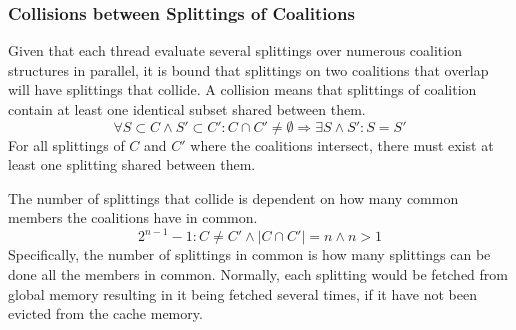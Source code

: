 \documentclass{llncs}
\begin{document}
\subsubsection{Collisions between Splittings of Coalitions} \label{sectionsplit}
Given that each thread evaluate several splittings over numerous coalition structures in parallel, 
it is bound that splittings on two coalitions that overlap will have splittings that collide.
A collision means that splittings of coalition contain at least one identical subset shared between them.
\begin{displaymath}\forall S\subset C \wedge S' \subset C' : C \cap C' \neq \emptyset \Rightarrow \exists S \wedge S' : S = S'\end{displaymath}
For all splittings of $C$ and $C'$ where the coalitions intersect, there must exist at least one splitting shared between them.

The number of splittings that collide is dependent on how many common members the coalitions have in common.
\begin{displaymath}2^{n-1}-1:C\neq C'\wedge |C \cap C'| = n \wedge n > 1 \end{displaymath}
Specifically, the number of splittings in common is how many splittings
can be done all the members in common. Normally, each splitting would be fetched from global memory resulting in it being fetched several times,  if it have not been evicted from the cache memory.
\end{document}
